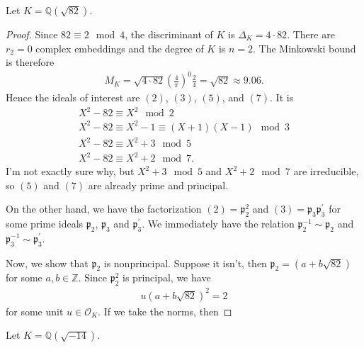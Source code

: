 \begin{exmbox}
    \begin{example}
        Let \(K = \mathbb{Q}(\sqrt{82})\).
    \end{example}    
\end{exmbox}
\begin{proof}
    Since \(82 \equiv 2 \mod{4}\), the discriminant of \(K\) is \(\Delta_K = 4 \cdot 82\). There are \(r_2 = 0\) complex embeddings and the degree of \(K\) is \(n = 2\). The Minkowski bound is therefore
    \begin{align*}
        M_K = \sqrt{4 \cdot 82} \left(\frac{4}{\pi}\right)^0 \frac{2}{4} = \sqrt{82} \approx 9.06 \text{.}
    \end{align*}
    Hence the ideals of interest are \((2)\), \((3)\), \((5)\), and \((7)\). It is
    \begin{align*}
        X^2 - 82 \equiv X^2 \mod{2} \\
        X^2 - 82 \equiv X^2 - 1 \equiv (X + 1)(X - 1) \mod{3} \\
        X^2 - 82 \equiv X^2 + 3 \mod{5} \\
        X^2 - 82 \equiv X^2 + 2 \mod{7} \text{.}
    \end{align*}
    I'm not exactly sure why, but \(X^2 + 3 \mod{5}\) and \(X^2 + 2 \mod{7}\) are irreducible, so \((5)\) and \((7)\) are already prime and principal.

    On the other hand, we have the factorization \((2) = \mathfrak{p}_2^2\) and \((3) = \mathfrak{p}_3 \mathfrak{p}_3^\prime\) for some prime ideals \(\mathfrak{p}_2\), \(\mathfrak{p}_3\) and \(\mathfrak{p}_3^\prime\). We immediately have the relation \(\mathfrak{p}_2^{-1} \sim \mathfrak{p}_2\) and \(\mathfrak{p}_3^{-1} \sim \mathfrak{p}_3^\prime\).

    Now, we show that \(\mathfrak{p}_2\) is nonprincipal. Suppose it isn't, then \(\mathfrak{p}_2 = (a + b \sqrt{82})\) for some \(a, b \in \mathbb{Z}\). Since \(\mathfrak{p}_2^2\) is principal, we have
    \begin{align*}
        u \left(a + b\sqrt{82}\right)^2 = 2
    \end{align*}
    for some unit \(u \in \mathcal{O}_K\). If we take the norms, then 
\end{proof}

\begin{example}
    Let \(K = \mathbb{Q}(\sqrt{-14})\).
\end{example}

